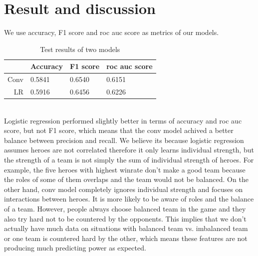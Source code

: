 \documentclass[a4paper, 10pt, conference]{ieeeconf}
\begin{document}
\section{Result and discussion}
We use accuracy, F1 score and roc auc score as metrics of our models.\\
\begin{table}[h]
\centering
\begin{tabular}{| r| l | l | l |}
	\hline
	 & Accuracy & F1 score & roc auc score \\ \hline
	Conv & 0.5841 & 0.6540 & 0.6151 \\ \hline
	LR & 0.5916 & 0.6456 & 0.6226\\ \hline

\end{tabular}
\caption{Test results of two models}
\end{table}\\
Logistic regression performed slightly better in terms of accuracy and roc auc score, but not F1 score, which means that the conv model achived a better balance between precision and recall. We believe its because logistic regression assumes heroes are not correlated therefore it only learns individual strength, but the strength of a team is not simply the sum of individual strength of heroes. For example, the five heroes with highest winrate don't make a good team because the roles of some of them overlaps and the team would not be balanced. On the other hand, conv model completely ignores individual strength and focuses on interactions between heroes. It is more likely to be aware of roles and the balance of a team. However, people always choose balanced team in the game and they also try hard not to be countered by the opponents. This implies that we don't actually have much data on situations with balanced team vs. imbalanced team or one team is countered hard by the other, which means these features are not producing much predicting power as expected. 

\nocite{*}


\end{document}
